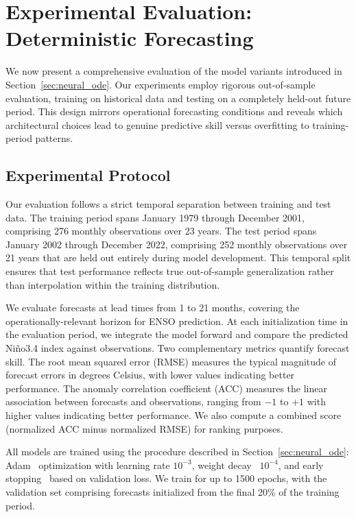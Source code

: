 \section{Experimental Evaluation: Deterministic Forecasting}
\label{sec:deterministic}

We now present a comprehensive evaluation of the model variants introduced in Section~\ref{sec:neural_ode}. Our experiments employ rigorous out-of-sample evaluation, training on historical data and testing on a completely held-out future period. This design mirrors operational forecasting conditions and reveals which architectural choices lead to genuine predictive skill versus overfitting to training-period patterns.

\subsection{Experimental Protocol}

Our evaluation follows a strict temporal separation between training and test data. The training period spans January 1979 through December 2001, comprising 276 monthly observations over 23 years. The test period spans January 2002 through December 2022, comprising 252 monthly observations over 21 years that are held out entirely during model development. This temporal split ensures that test performance reflects true out-of-sample generalization rather than interpolation within the training distribution.

We evaluate forecasts at lead times from 1 to 21 months, covering the operationally-relevant horizon for ENSO prediction. At each initialization time in the evaluation period, we integrate the model forward and compare the predicted Ni\~no3.4 index against observations. Two complementary metrics quantify forecast skill. The root mean squared error (RMSE) measures the typical magnitude of forecast errors in degrees Celsius, with lower values indicating better performance. The anomaly correlation coefficient (ACC) measures the linear association between forecasts and observations, ranging from $-1$ to $+1$ with higher values indicating better performance. We also compute a combined score (normalized ACC minus normalized RMSE) for ranking purposes.

All models are trained using the procedure described in Section~\ref{sec:neural_ode}: Adam~\cite{kingma2015adam} optimization with learning rate $10^{-3}$, weight decay~\cite{krogh1992simple} $10^{-4}$, and early stopping~\cite{prechelt1998early} based on validation loss. We train for up to 1500 epochs, with the validation set comprising forecasts initialized from the final 20\% of the training period.

